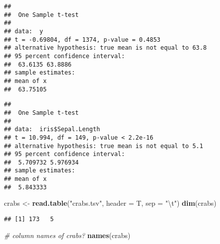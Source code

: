 \documentclass[]{article}
\newenvironment{Shaded}{\begin{snugshade}}{\end{snugshade}}
\newcommand{\CharTok}[1]{\textcolor[rgb]{0.31,0.60,0.02}{#1}}
\newcommand{\CommentTok}[1]{\textcolor[rgb]{0.56,0.35,0.01}{\textit{#1}}}
\newcommand{\DataTypeTok}[1]{\textcolor[rgb]{0.13,0.29,0.53}{#1}}
\newcommand{\FloatTok}[1]{\textcolor[rgb]{0.00,0.00,0.81}{#1}}
\newcommand{\KeywordTok}[1]{\textcolor[rgb]{0.13,0.29,0.53}{\textbf{#1}}}
\newcommand{\NormalTok}[1]{#1}
\newcommand{\OperatorTok}[1]{\textcolor[rgb]{0.81,0.36,0.00}{\textbf{#1}}}
\newcommand{\StringTok}[1]{\textcolor[rgb]{0.31,0.60,0.02}{#1}}
\begin{document}
\begin{Shaded}
\end{Shaded}

\begin{verbatim}
## 
##  One Sample t-test
## 
## data:  y
## t = -0.69804, df = 1374, p-value = 0.4853
## alternative hypothesis: true mean is not equal to 63.8
## 95 percent confidence interval:
##  63.6135 63.8886
## sample estimates:
## mean of x 
##  63.75105
\end{verbatim}

\begin{Shaded}
\end{Shaded}

\begin{verbatim}
## 
##  One Sample t-test
## 
## data:  iris$Sepal.Length
## t = 10.994, df = 149, p-value < 2.2e-16
## alternative hypothesis: true mean is not equal to 5.1
## 95 percent confidence interval:
##  5.709732 5.976934
## sample estimates:
## mean of x 
##  5.843333
\end{verbatim}

\begin{Shaded}
\begin{Highlighting}[]
\NormalTok{crabs <-}\StringTok{ }\KeywordTok{read.table}\NormalTok{(}\StringTok{"crabs.tsv"}\NormalTok{, }\DataTypeTok{header =}\NormalTok{ T, }\DataTypeTok{sep =} \StringTok{"}\CharTok{\textbackslash{}t}\StringTok{"}\NormalTok{) }
\KeywordTok{dim}\NormalTok{(crabs)}
\end{Highlighting}
\end{Shaded}

\begin{verbatim}
## [1] 173   5
\end{verbatim}

\begin{Shaded}
\begin{Highlighting}[]
\CommentTok{# column names of crabs?}
\KeywordTok{names}\NormalTok{(crabs)}
\end{Highlighting}
\end{Shaded}
\end{document}
